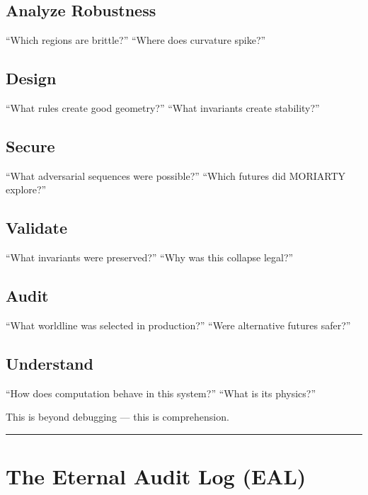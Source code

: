 \subsection{Analyze Robustness}\label{analyze-robustness}

``Which regions are brittle?'' ``Where does curvature spike?''

\subsection{Design}\label{design-provenance}

``What rules create good geometry?'' ``What invariants create
stability?''

\subsection{Secure}\label{secure}

``What adversarial sequences were possible?'' ``Which futures did
MORIARTY explore?''

\subsection{Validate}\label{validate}

``What invariants were preserved?'' ``Why was this collapse legal?''

\subsection{Audit}\label{audit}

``What worldline was selected in production?'' ``Were alternative
futures safer?''

\subsection{Understand}\label{understand}

``How does computation behave in this system?'' ``What is its physics?''

This is beyond debugging --- this is comprehension.

\begin{center}\rule{0.5\linewidth}{0.5pt}\end{center}

\section{The Eternal Audit Log (EAL)}%
  \label{the-eternal-audit-log}

